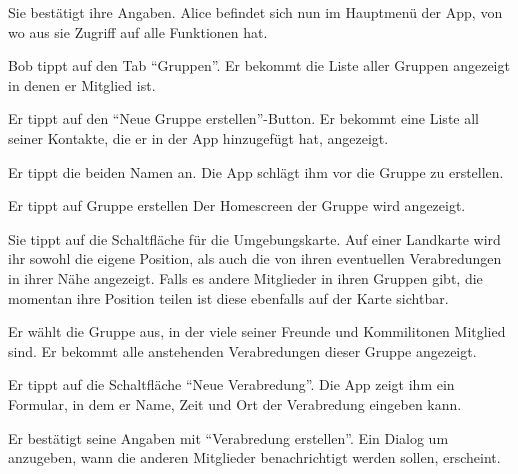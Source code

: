 \documentclass[parskip=full,11pt]{scrartcl}
\begin{document}
{Sie bestätigt ihre Angaben.}
{Alice befindet sich nun im Hauptmenü der App, von wo aus sie Zugriff auf alle Funktionen hat.}


{Bob tippt auf den Tab  \enquote{Gruppen}.}
{Er bekommt die Liste aller Gruppen angezeigt in denen er Mitglied ist.}

{Er tippt auf den \enquote{Neue Gruppe erstellen}-Button.}
{Er bekommt eine Liste all seiner Kontakte, die er in der App hinzugefügt hat, angezeigt.}

{Er tippt die beiden Namen an.}
{Die App schlägt ihm vor die Gruppe zu erstellen.}

{Er tippt auf Gruppe erstellen}
{Der Homescreen der Gruppe wird angezeigt.} %

{Sie tippt auf die Schaltfläche für die Umgebungskarte.}
{Auf einer Landkarte wird ihr sowohl die eigene Position, als auch die von ihren
eventuellen Verabredungen in ihrer Nähe angezeigt.
Falls es andere Mitglieder in ihren Gruppen gibt, die momentan
ihre Position teilen ist diese ebenfalls auf der Karte sichtbar.}


{Er wählt die Gruppe aus, in der viele seiner Freunde und Kommilitonen Mitglied sind.}
{Er bekommt alle anstehenden Verabredungen dieser Gruppe angezeigt.}

{Er tippt auf die Schaltfläche \enquote{Neue Verabredung}.}
{Die App zeigt ihm ein Formular, in dem er Name, Zeit und Ort der Verabredung eingeben kann.}

{Er bestätigt seine Angaben mit \enquote{Verabredung erstellen}.}
{Ein Dialog um anzugeben, wann die anderen Mitglieder benachrichtigt werden sollen, erscheint.}
\end{document}
